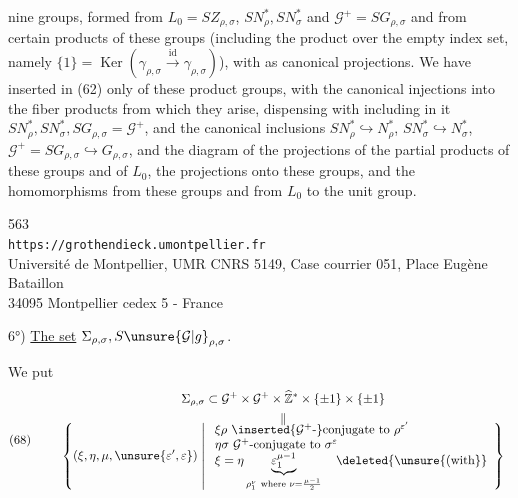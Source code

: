 
nine groups,  formed from $L_{0}=SZ_{\rho,\sigma}$, $SN_{\rho}^{*},SN_{\sigma}^{*}$ and $\mathcal{G}^{+}=SG_{\rho,\sigma}$ and from certain products of these groups (including the product over the empty index set, namely $\{1\}=\operatorname{Ker}(\gamma_{\rho,\sigma}\xrightarrow{\mathrm{id}}\gamma_{\rho,\sigma})$), with as  canonical projections. We have inserted in (62) only  of these product groups, with the canonical injections into the fiber products from which they arise,  dispensing with including in it  $SN_{\rho}^{*},SN_{\sigma}^{*},SG_{\rho,\sigma}=\mathcal{G}^{+}$, and the canonical inclusions $SN_{\rho}^{*}\hookrightarrow N_{\rho}^{*}$, $SN_{\sigma}^{*}\hookrightarrow N_{\sigma}^{*}$, $\mathcal{G}^{+}=SG_{\rho,\sigma}\hookrightarrow G_{\rho,\sigma}$, and the   diagram of the projections of the partial products of these groups and of $L_{0}$,   the projections onto these  groups, and the homomorphisms from these groups and from $L_{0}$ to the unit group.


{\small
\begin{center}
563\\
\texttt{https://grothendieck.umontpellier.fr}\\
Université de Montpellier, UMR CNRS 5149, Case courrier 051, Place Eugène Bataillon\\
34095 Montpellier cedex 5 - France
\end{center}
}


6°) \uline{The set} $\Sigma_{\rho,\sigma},S\unsure{\mathcal{G}|g}_{\rho,\sigma}$.\par\nobreak
We put
\[
\text{(68)}\qquad
\begin{gathered}
\Sigma_{\rho,\sigma}\subset\mathcal{G}^{+}\times\mathcal{G}^{+}\times\widehat{\mathbb Z}^{*}\times\{\pm1\}\times\{\pm1\}\\
\begin{array}{c}
\Vert\\[-0.4em]
\displaystyle
\left\{(\xi,\eta,\mu,\unsure{\varepsilon',\varepsilon})\;\middle|\;
\begin{array}{l}
\xi\rho\ \inserted{\mathcal{G}^{+}\text{-}}\text{conjugate to }\rho^{\varepsilon'}\\
\eta\sigma\ \mathcal{G}^{+}\text{-conjugate to }\sigma^{\varepsilon}\\
\xi=\eta\underbrace{\varepsilon_{1}^{\mu-1}}_{\rho_{1}^{\nu}\ \text{where }\nu=\frac{\mu-1}{2}}\quad\deleted{\unsure{\text{(with}}}
\end{array}\right\}
\end{array}
\end{gathered}
\]

